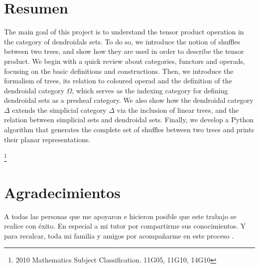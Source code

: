 \documentclass[11pt,a4paper,openright,oneside]{article}
\numberwithin{equation}{section}
\theoremstyle{definition}
\begin{document}


\section*{Resumen}
The main goal of this project is to understand the tensor product operation in the category of dendroidals sets.
To do so, we introduce the notion of shuffles between two trees, and show how they are used in order to describe the tensor product.
We begin with a quick review about categories, functors and operads, focusing on the basic definitions and constructions.
Then, we introduce the formalism of trees, its relation to coloured operad and the definition of the dendroidal category $\Omega$, which serves as the indexing category for defining dendroidal sets as a presheaf category.
We also show how the dendroidal category $\Delta$ extends the simplicial category $\Delta$ via the inclusion of linear trees, and the relation between simplicial sets and dendroidal sets.
Finally, we develop a Python algorithm that generates the complete set of shuffles between two trees and prints their planar representations.

 {\let\thefootnote\relax\footnote{2010 Mathematics Subject Classification. 11G05, 11G10, 14G10}}
\newpage


\section*{Agradecimientos}
A todas las personas que me apoyaron e hicieron posible que este trabajo se realice con \'exito.
En especial a mi tutor por compartirme sus conocimientos.
Y para recalcar, toda mi familia y amigos por acompa\~narme en este proceso .

\newpage


\tableofcontents
\newpage

\end{document}
